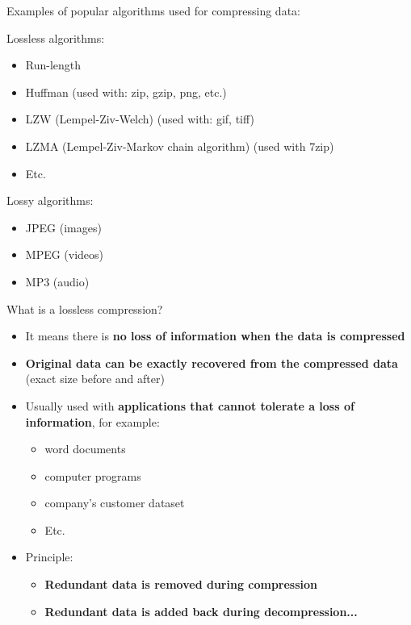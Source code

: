 \documentclass[handout]{beamer}[10pt, usepdftitle=false]
\begin{document}
	\begin{frame}
	
	Examples of popular algorithms used for compressing data:
	\vspace*{0.6em}	
	
	Lossless algorithms:
	\begin{itemize}
		\item{Run-length}
		\item{Huffman (used with: zip, gzip, png, etc.)}
		\item{LZW (Lempel-Ziv-Welch) (used with: gif, tiff)}
		\item{LZMA (Lempel-Ziv-Markov chain algorithm) (used with 7zip)}
		\item{Etc.}		
	\end{itemize}
	
	Lossy algorithms:
	\begin{itemize}
		\item{JPEG (images)}
		\item{MPEG (videos)}
		\item{MP3 (audio)}
	\end{itemize}
	
	\end{frame}
	\begin{frame}
	
	What is a lossless compression?
	\vspace*{0.6em}
	
	\begin{itemize}
		\item{It means there is \textbf{no loss of information when the data is compressed}}
		\item{\textbf{Original data can be exactly recovered from the compressed data} (exact size before and after)}
		\item{Usually used with \textbf{applications that cannot tolerate a loss of information}, for example:
			\begin{itemize}
				\item{word documents}
				\item{computer programs}
				\item{company's customer dataset}
				\item{Etc.}
			\end{itemize}					
		}
		\item{Principle: 
			\begin{itemize}
				\item{\textbf{Redundant data is removed during compression}}
				\item{\textbf{Redundant data is added back during decompression...}}
			\end{itemize}			
		}		
	\end{itemize}
	
	\end{frame}	
	
\end{document}
